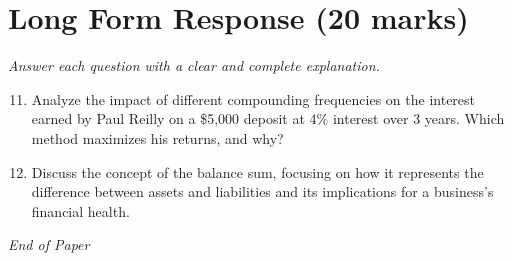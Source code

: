 \documentclass[12pt]{article}
\begin{document}
\section*{Long Form Response (20 marks)}
\textit{Answer each question with a clear and complete explanation.}
\begin{enumerate}[label=\arabic*.]
\setcounter{enumi}{10}
\item Analyze the impact of different compounding frequencies on the interest earned by Paul Reilly on a \$5,000 deposit at 4\% interest over 3 years. Which method maximizes his returns, and why?
\item Discuss the concept of the balance sum, focusing on how it represents the difference between assets and liabilities and its implications for a business's financial health.
\end{enumerate}

\vfill
\noindent\textit{End of Paper}
\end{document}
